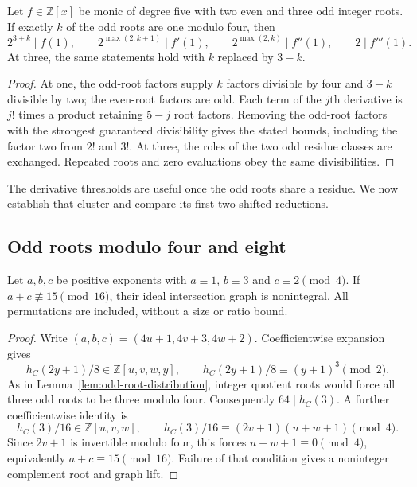 \begin{lemma}
\label{lem:derivative-thresholds}
Let $f\in\mathbb Z[x]$ be monic of degree five with two even and three
odd integer roots. If exactly $k$ of the odd roots are one modulo four,
then
\[
 2^{3+k}\mid f(1),\qquad
 2^{\max(2,k+1)}\mid f'(1),\qquad
 2^{\max(2,k)}\mid f''(1),\qquad 2\mid f'''(1).
\]
At three, the same statements hold with $k$ replaced by $3-k$.
\end{lemma}

\begin{proof}
At one, the odd-root factors supply $k$ factors divisible by four and
$3-k$ divisible by two; the even-root factors are odd. Each term of
the $j$th derivative is $j!$ times a product retaining $5-j$ root factors.
Removing the odd-root factors with the strongest guaranteed divisibility
gives the stated bounds, including the factor two from $2!$ and $3!$.
At three, the roles of the two odd residue classes are exchanged.
Repeated roots and zero evaluations obey the same divisibilities.
\end{proof}

The derivative thresholds are useful once the odd roots share a residue.
We now establish that cluster and compare its first two shifted reductions.

\subsection{Odd roots modulo four and eight}

\begin{proposition}
\label{thm:odd-root-sum}
Let $a,b,c$ be positive exponents with
$a\equiv1$, $b\equiv3$ and $c\equiv2\pmod4$.
If $a+c\not\equiv15\pmod{16}$, their ideal intersection graph is
nonintegral. All permutations are included, without a size or ratio bound.
\end{proposition}

\begin{proof}
Write $(a,b,c)=(4u+1,4v+3,4w+2)$. Coefficientwise expansion gives
\[
 h_C(2y+1)/8\in\mathbb Z[u,v,w,y],\qquad
 h_C(2y+1)/8\equiv(y+1)^3\pmod2.
\]
As in Lemma~\ref{lem:odd-root-distribution}, integer quotient roots
would force all three odd roots to be three modulo four. Consequently
$64\mid h_C(3)$. A further coefficientwise identity is
\[
 h_C(3)/16\in\mathbb Z[u,v,w],\qquad
 h_C(3)/16\equiv(2v+1)(u+w+1)\pmod4.
\]
Since $2v+1$ is invertible modulo four, this forces
$u+w+1\equiv0\pmod4$, equivalently $a+c\equiv15\pmod{16}$.
Failure of that condition gives a noninteger complement root and graph lift.
\end{proof}

